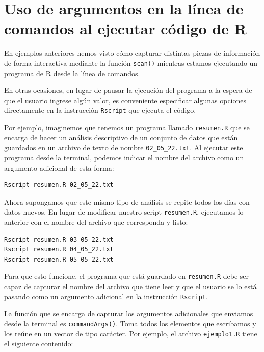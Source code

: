 \documentclass[
]{book}
\begin{document}
\hypertarget{uso-de-argumentos-en-la-luxednea-de-comandos-al-ejecutar-cuxf3digo-de-r}{%
\section{Uso de argumentos en la línea de comandos al ejecutar código de R}\label{uso-de-argumentos-en-la-luxednea-de-comandos-al-ejecutar-cuxf3digo-de-r}}

En ejemplos anteriores hemos visto cómo capturar distintas piezas de información de forma interactiva mediante la función \texttt{scan()} mientras estamos ejecutando un programa de R desde la línea de comandos.

En otras ocasiones, en lugar de pausar la ejecución del programa a la espera de que el usuario ingrese algún valor, es conveniente especificar algunas opciones directamente en la instrucción \texttt{Rscript} que ejecuta el código.

Por ejemplo, imaginemos que tenemos un programa llamado \texttt{resumen.R} que se encarga de hacer un análisis descriptivo de un conjunto de datos que están guardados en un archivo de texto de nombre \texttt{02\_05\_22.txt}. Al ejecutar este programa desde la terminal, podemos indicar el nombre del archivo como un argumento adicional de esta forma:

\begin{verbatim}
Rscript resumen.R 02_05_22.txt
\end{verbatim}

Ahora supongamos que este mismo tipo de análisis se repite todos los días con datos nuevos. En lugar de modificar nuestro script \texttt{resumen.R}, ejecutamos lo anterior con el nombre del archivo que corresponda y listo:

\begin{verbatim}
Rscript resumen.R 03_05_22.txt
Rscript resumen.R 04_05_22.txt
Rscript resumen.R 05_05_22.txt
\end{verbatim}

Para que esto funcione, el programa que está guardado en \texttt{resumen.R} debe ser capaz de capturar el nombre del archivo que tiene leer y que el usuario se lo está pasando como un argumento adicional en la instrucción \texttt{Rscript}.

La función que se encarga de capturar los argumentos adicionales que enviamos desde la terminal es \texttt{commandArgs()}. Toma todos los elementos que escribamos y los reúne en un vector de tipo carácter. Por ejemplo, el archivo \texttt{ejemplo1.R} tiene el siguiente contenido:
\end{document}
